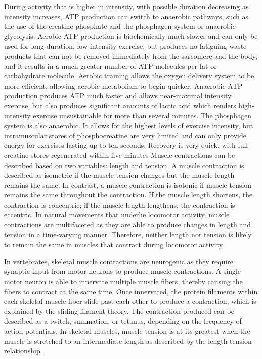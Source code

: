 During activity that is higher in intensity, with possible duration decreasing as intensity increases, ATP production can switch to anaerobic pathways, such as the use of the creatine phosphate and the phosphagen system or anaerobic glycolysis. Aerobic ATP production is biochemically much slower and can only be used for long-duration, low-intensity exercise, but produces no fatiguing waste products that can not be removed immediately from the sarcomere and the body, and it results in a much greater number of ATP molecules per fat or carbohydrate molecule. Aerobic training allows the oxygen delivery system to be more efficient, allowing aerobic metabolism to begin quicker. Anaerobic ATP production produces ATP much faster and allows near-maximal intensity exercise, but also produces significant amounts of lactic acid which renders high-intensity exercise unsustainable for more than several minutes. The phosphagen system is also anaerobic. It allows for the highest levels of exercise intensity, but intramuscular stores of phosphocreatine are very limited and can only provide energy for exercises lasting up to ten seconds. Recovery is very quick, with full creatine stores regenerated within five minutes
Muscle contractions can be described based on two variables: length and tension. A muscle contraction is described as isometric if the muscle tension changes but the muscle length remains the same. In contrast, a muscle contraction is isotonic if muscle tension remains the same throughout the contraction. If the muscle length shortens, the contraction is concentric; if the muscle length lengthens, the contraction is eccentric. In natural movements that underlie locomotor activity, muscle contractions are multifaceted as they are able to produce changes in length and tension in a time-varying manner. Therefore, neither length nor tension is likely to remain the same in muscles that contract during locomotor activity.

In vertebrates, skeletal muscle contractions are neurogenic as they require synaptic input from motor neurons to produce muscle contractions. A single motor neuron is able to innervate multiple muscle fibers, thereby causing the fibers to contract at the same time. Once innervated, the protein filaments within each skeletal muscle fiber slide past each other to produce a contraction, which is explained by the sliding filament theory. The contraction produced can be described as a twitch, summation, or tetanus, depending on the frequency of action potentials. In skeletal muscles, muscle tension is at its greatest when the muscle is stretched to an intermediate length as described by the length-tension relationship.

